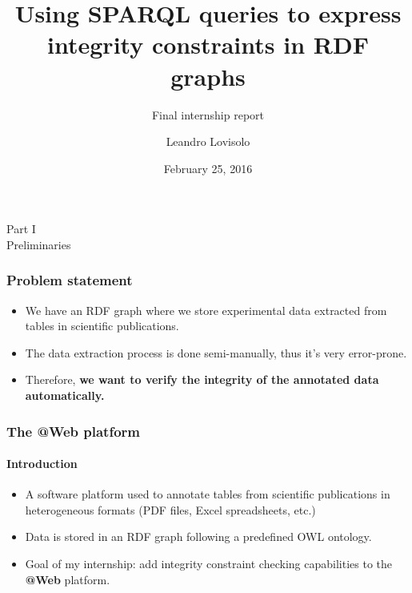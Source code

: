 \documentclass{beamer}
\title{Using SPARQL queries to express integrity constraints in RDF graphs}
\subtitle{
  \vspace{0.5cm}
  Final internship report
}
\author{
  Leandro Lovisolo
}
\date{February 25, 2016}
\institute{
  INRA SupAgro and INRIA GraphiK \\
  Montpellier, France
}
\makeatletter
\newcommand{\atweb}{\textbf{@Web}\xspace}
\newcommand{\partslide}[2]{
  \begin{center}
    \LARGE{#1} \\
    \vspace{0.5cm}
    \huge{#2}
  \end{center}
}
\makeatother
\begin{document}
\begin{frame}
  \titlepage
\end{frame}


\begin{frame}
  \partslide{Part I}{Preliminaries}
\end{frame}

\begin{frame}
  \frametitle{Problem statement}

  \begin{itemize}
    \item We have an RDF graph where we store experimental data extracted from
      tables in scientific publications.

    \item The data extraction process is done semi-manually, thus it's very
      error-prone.

    \item Therefore, \textbf{we want to verify the integrity of the annotated
      data automatically.}
  \end{itemize}
\end{frame}

\begin{frame}
  \frametitle{The \atweb platform}
  \framesubtitle{Introduction}

  \begin{itemize}
    \item A software platform used to annotate tables from scientific
      publications in heterogeneous formats (PDF files, Excel spreadsheets,
      etc.)

    \item Data is stored in an RDF graph following a predefined OWL ontology.

    \item Goal of my internship: add integrity constraint checking capabilities
      to the \atweb platform.
  \end{itemize}
\end{frame}
\end{document}
